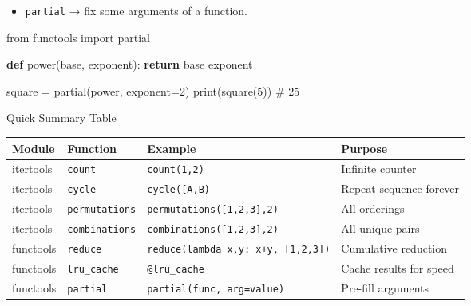 \documentclass[
  letterpaper,
  DIV=11,
  numbers=noendperiod]{scrreprt}
\newenvironment{Shaded}{\begin{snugshade}}{\end{snugshade}}
\newcommand{\BuiltInTok}[1]{\textcolor[rgb]{0.00,0.23,0.31}{#1}}
\newcommand{\CommentTok}[1]{\textcolor[rgb]{0.37,0.37,0.37}{#1}}
\newcommand{\ControlFlowTok}[1]{\textcolor[rgb]{0.00,0.23,0.31}{\textbf{#1}}}
\newcommand{\DecValTok}[1]{\textcolor[rgb]{0.68,0.00,0.00}{#1}}
\newcommand{\ImportTok}[1]{\textcolor[rgb]{0.00,0.46,0.62}{#1}}
\newcommand{\KeywordTok}[1]{\textcolor[rgb]{0.00,0.23,0.31}{\textbf{#1}}}
\newcommand{\NormalTok}[1]{\textcolor[rgb]{0.00,0.23,0.31}{#1}}
\newcommand{\OperatorTok}[1]{\textcolor[rgb]{0.37,0.37,0.37}{#1}}
\providecommand{\tightlist}{%
  \setlength{\itemsep}{0pt}\setlength{\parskip}{0pt}}
\begin{document}
\begin{itemize}
\tightlist
\item
  \texttt{partial} → fix some arguments of a function.
\end{itemize}

\begin{Shaded}
\begin{Highlighting}[]
\ImportTok{from}\NormalTok{ functools }\ImportTok{import}\NormalTok{ partial}

\KeywordTok{def}\NormalTok{ power(base, exponent):}
    \ControlFlowTok{return}\NormalTok{ base  exponent}

\NormalTok{square }\OperatorTok{=}\NormalTok{ partial(power, exponent}\OperatorTok{=}\DecValTok{2}\NormalTok{)}
\BuiltInTok{print}\NormalTok{(square(}\DecValTok{5}\NormalTok{))  }\CommentTok{\# 25}
\end{Highlighting}
\end{Shaded}

Quick Summary Table

\begin{longtable}[]{@{}
  >{\raggedright\arraybackslash}p{}
  >{\raggedright\arraybackslash}p{}
  >{\raggedright\arraybackslash}p{}
  >{\raggedright\arraybackslash}p{}@{}}
\toprule\noalign{}
\begin{minipage}[b]{\linewidth}\raggedright
Module
\end{minipage} & \begin{minipage}[b]{\linewidth}\raggedright
Function
\end{minipage} & \begin{minipage}[b]{\linewidth}\raggedright
Example
\end{minipage} & \begin{minipage}[b]{\linewidth}\raggedright
Purpose
\end{minipage} \\
\midrule\noalign{}
\endhead
\bottomrule\noalign{}
\endlastfoot
itertools & \texttt{count} & \texttt{count(1,2)} & Infinite counter \\
itertools & \texttt{cycle} &
\texttt{cycle({[}\textquotesingle{}A\textquotesingle{},\textquotesingle{}B\textquotesingle{}{]})}
& Repeat sequence forever \\
itertools & \texttt{permutations} & \texttt{permutations({[}1,2,3{]},2)}
& All orderings \\
itertools & \texttt{combinations} & \texttt{combinations({[}1,2,3{]},2)}
& All unique pairs \\
functools & \texttt{reduce} &
\texttt{reduce(lambda\ x,y:\ x+y,\ {[}1,2,3{]})} & Cumulative
reduction \\
functools & \texttt{lru\_cache} & \texttt{@lru\_cache} & Cache results
for speed \\
functools & \texttt{partial} & \texttt{partial(func,\ arg=value)} &
Pre-fill arguments \\
\end{longtable}
\end{document}
